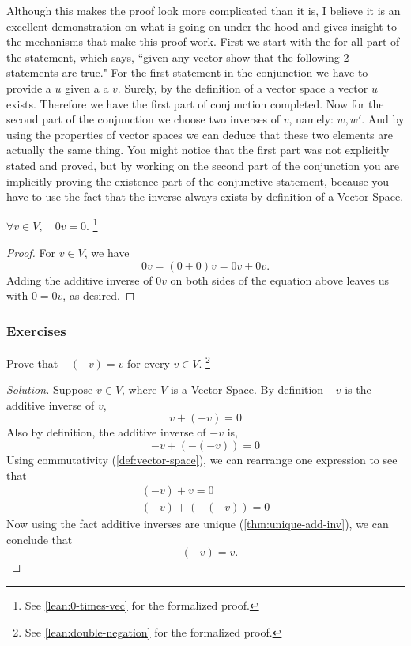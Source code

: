\documentclass[12pt]{book}
\begin{document}
Although this makes the proof look more complicated than it is, I believe it is an excellent demonstration on what is going on under the hood and gives insight to the mechanisms that make this proof work. First we start with the for all part of the statement, which says, ``given any vector show that the following 2 statements are true." For the first statement in the conjunction we have to provide a $u$ given a a $v$. Surely, by the definition of a vector space a vector $u$ exists. Therefore we have the first part of conjunction completed. Now for the second part of the conjunction we choose two inverses of $v$, namely: $w,w'$. And by using the properties of vector spaces we can deduce that these two elements are actually the same thing. You might notice that the first part was not explicitly stated and proved, but by working on the second part of the conjunction you are implicitly proving the existence part of the conjunctive statement, because you have to use the fact that the inverse always exists by definition of a Vector Space.

\begin{theorem} \label{thm:0-times-vec}
    $\forall v \in V, \quad 0v = 0.$ \footnote{See \ref{lean:0-times-vec} for the formalized proof.}
\end{theorem}

\begin{proof}
    For $v \in V$, we have
    \[
        0v = (0 + 0)v = 0v + 0v.
    \]
    Adding the additive inverse of $0v$ on both sides of the equation above leaves us with $0 = 0v$, as desired.
\end{proof}



\newpage

\subsubsection*{Exercises}



\begin{exercise}\label{ex:double-negation}
    Prove that $-(-v) = v$ for every $v \in V$. \footnote{See \ref{lean:double-negation} for the formalized proof.}
\end{exercise}


\begin{proof}[Solution]
    Suppose $v \in V$, where $V$ is a Vector Space. 
    By definition $-v$ is the additive inverse of $v$, 
    \[
        v + (-v) = 0
    \]
    Also by definition, the additive inverse of $-v$ is, 
    \[
        -v + (-(-v)) = 0
    \]
    Using commutativity (\ref{def:vector-space}), we can rearrange one expression to see that
    \[
        \begin{aligned}
            (-v) + v = 0 \\
            (-v) + (-(-v)) = 0
        \end{aligned}
    \]
    Now using the fact additive inverses are unique (\ref{thm:unique-add-inv}), we can conclude that 
    \[
        -(-v) = v.
    \]
\end{proof}
\end{document}
